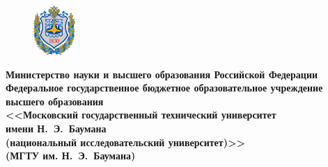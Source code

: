 \documentclass[a4paper]{article}
\begin{document}
	\begin{titlepage}
		\centering
		\begin{figure}
			\vspace{5mm}
			\hspace{-5.8mm}
			\includegraphics[width=0.93\linewidth]{gerb}
		\end{figure}
		{\singlespacing \footnotesize \bfseries Министерство науки и высшего образования Российской Федерации\\Федеральное государственное бюджетное образовательное учреждение\\высшего образования\\<<Московский государственный технический университет\\имени Н.~Э.~Баумана\\ (национальный исследовательский университет)>>\\(МГТУ им. Н.~Э.~Баумана)\\}
		
		\textbf {\bf \underline{\hspace{\linewidth}}}
		

\end{titlepage}
\end{document}
